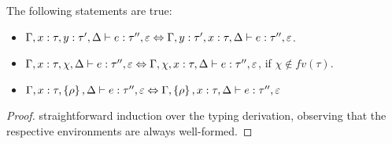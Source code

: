 \documentclass[a4paper]{article}
\begin{document}
\begin{prop}
  \label{prop:genexchange}
  The following statements are true:
  \begin{itemize}
    \item $\Gamma, x : \tau, y : \tau', \Delta \vdash e : \tau'', \varepsilon \Leftrightarrow \Gamma, y :
      \tau', x : \tau, \Delta \vdash e : \tau'', \varepsilon $.
   \item  $\Gamma, x : \tau, \chi , \Delta \vdash e : \tau'', \varepsilon \Leftrightarrow\Gamma,\chi, x
     : \tau, \Delta \vdash e : \tau'', \varepsilon $, if $\chi\notin fv(\tau)$.
   \item  $\Gamma, x : \tau, \left\{ \rho \right\} ,
     \Delta \vdash e : \tau'', \varepsilon \Leftrightarrow\Gamma,\left\{ \rho \right\}, x : \tau, \Delta \vdash e : \tau'', \varepsilon $
 \end{itemize}
\end{prop}
\begin{proof}
  straightforward induction over the typing derivation, observing that the
  respective environments are always well-formed.
\end{proof}
\end{document}
